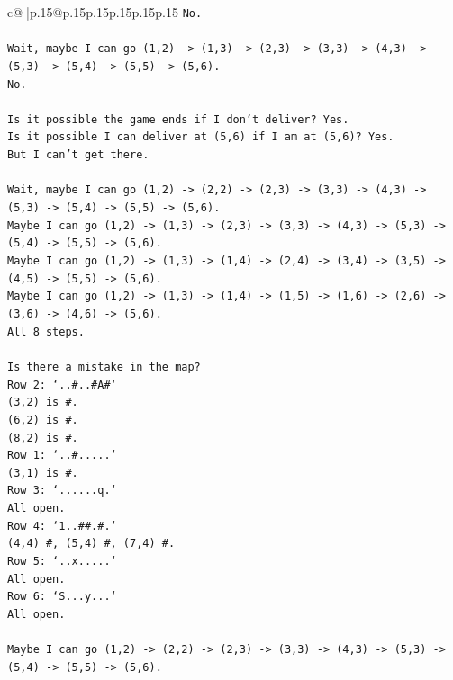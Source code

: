 \documentclass{article}
\begin{document}
{\begin{supertabular}{c@{$\;$}|p{.15\linewidth}@{}p{.15\linewidth}p{.15\linewidth}p{.15\linewidth}p{.15\linewidth}p{.15\linewidth}}
{{{\texttt{No.} \\
\\ 
\texttt{Wait, maybe I can go (1,2) {-}> (1,3) {-}> (2,3) {-}> (3,3) {-}> (4,3) {-}> (5,3) {-}> (5,4) {-}> (5,5) {-}> (5,6).} \\
\texttt{No.} \\
\\ 
\texttt{Is it possible the game ends if I don't deliver? Yes.} \\
\texttt{Is it possible I can deliver at (5,6) if I am at (5,6)? Yes.} \\
\texttt{But I can't get there.} \\
\\ 
\texttt{Wait, maybe I can go (1,2) {-}> (2,2) {-}> (2,3) {-}> (3,3) {-}> (4,3) {-}> (5,3) {-}> (5,4) {-}> (5,5) {-}> (5,6).} \\
\texttt{Maybe I can go (1,2) {-}> (1,3) {-}> (2,3) {-}> (3,3) {-}> (4,3) {-}> (5,3) {-}> (5,4) {-}> (5,5) {-}> (5,6).} \\
\texttt{Maybe I can go (1,2) {-}> (1,3) {-}> (1,4) {-}> (2,4) {-}> (3,4) {-}> (3,5) {-}> (4,5) {-}> (5,5) {-}> (5,6).} \\
\texttt{Maybe I can go (1,2) {-}> (1,3) {-}> (1,4) {-}> (1,5) {-}> (1,6) {-}> (2,6) {-}> (3,6) {-}> (4,6) {-}> (5,6).} \\
\texttt{All 8 steps.} \\
\\ 
\texttt{Is there a mistake in the map?} \\
\texttt{Row 2: `..\#..\#A\#`} \\
\texttt{(3,2) is \#.} \\
\texttt{(6,2) is \#.} \\
\texttt{(8,2) is \#.} \\
\texttt{Row 1: `..\#.....`} \\
\texttt{(3,1) is \#.} \\
\texttt{Row 3: `......q.`} \\
\texttt{All open.} \\
\texttt{Row 4: `1..\#\#.\#.`} \\
\texttt{(4,4) \#, (5,4) \#, (7,4) \#.} \\
\texttt{Row 5: `..x.....`} \\
\texttt{All open.} \\
\texttt{Row 6: `S...y...`} \\
\texttt{All open.} \\
\\ 
\texttt{Maybe I can go (1,2) {-}> (2,2) {-}> (2,3) {-}> (3,3) {-}> (4,3) {-}> (5,3) {-}> (5,4) {-}> (5,5) {-}> (5,6).} \\
}}}
\end{supertabular}}
\end{document}
